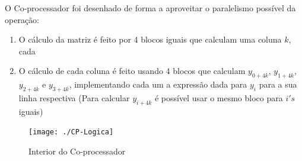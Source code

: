 O Co-processador foi desenhado de forma a aproveitar o paralelismo possível da operação:

\begin{enumerate}
\item O cálculo da matriz é feito por 4 blocos iguais que calculam uma coluna $k$, cada
\item O cálculo de cada coluna é feito usando 4 blocos que calculam $y_{0+4k}$, $y_{1+4k}$, $y_{2+4k}$ e $y_{3+4k}$, implementando cada um a expressão dada para $y_i$ para a sua linha respectiva (Para calcular $y_{i+4k}$ é possível usar o mesmo bloco para $i's$ iguais) 
\end{enumerate}

\begin{figure}[H]
    \centering
    \texttt{[image: ./CP-Logica]}~\\[1cm]
    \caption{Interior do Co-processador}
    \label{fig:CP-L}
\end{figure}